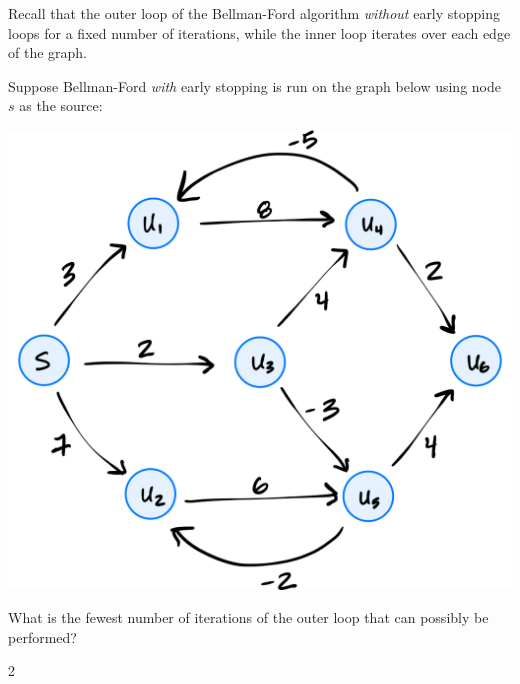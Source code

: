 \begin{prob}

    Recall that the outer loop of the Bellman-Ford algorithm \textit{without}
    early stopping loops for a fixed number of iterations, while the inner loop
    iterates over each edge of the graph.

    Suppose Bellman-Ford \textit{with} early stopping is run on the graph below using node
    $s$ as the source:

    \includegraphics{./graph.png}

    What is the fewest number of iterations of the outer loop that can possibly
    be performed?

    \begin{soln}
        2
    \end{soln}

\end{prob}
